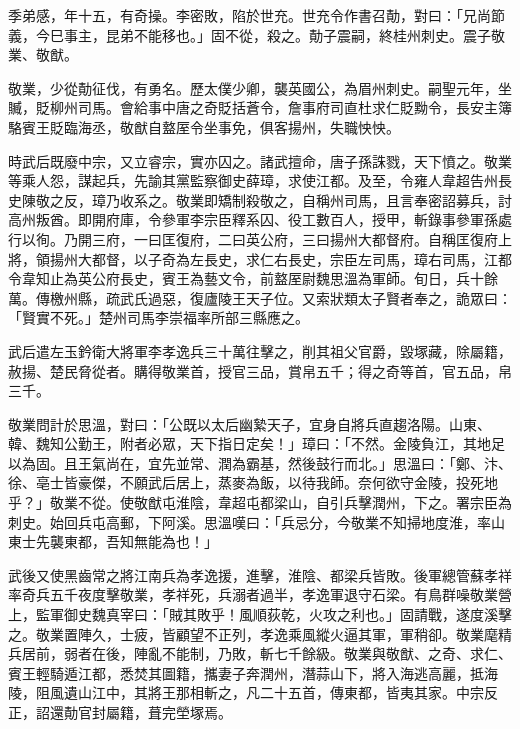 \begin{pinyinscope}
 季弟感，年十五，有奇操。李密敗，陷於世充。世充令作書召勣，對曰：「兄尚節義，今巳事主，昆弟不能移也。」固不從，殺之。勣子震嗣，終桂州刺史。震子敬業、敬猷。



 敬業，少從勣征伐，有勇名。歷太僕少卿，襲英國公，為眉州刺史。嗣聖元年，坐贓，貶柳州司馬。會給事中唐之奇貶括蒼令，詹事府司直杜求仁貶黝令，長安主簿駱賓王貶臨海丞，敬猷自盩厔令坐事免，俱客揚州，失職怏怏。



 時武后既廢中宗，又立睿宗，實亦囚之。諸武擅命，唐子孫誅戮，天下憤之。敬業等乘人怨，謀起兵，先諭其黨監察御史薛璋，求使江都。及至，令雍人韋超告州長史陳敬之反，璋乃收系之。敬業即矯制殺敬之，自稱州司馬，且言奉密詔募兵，討高州叛酋。即開府庫，令參軍李宗臣釋系囚、役工數百人，授甲，斬錄事參軍孫處行以徇。乃開三府，一曰匡復府，二曰英公府，三曰揚州大都督府。自稱匡復府上將，領揚州大都督，以子奇為左長史，求仁右長史，宗臣左司馬，璋右司馬，江都令韋知止為英公府長史，賓王為藝文令，前盩厔尉魏思溫為軍師。旬日，兵十餘萬。傳檄州縣，疏武氏過惡，復廬陵王天子位。又索狀類太子賢者奉之，詭眾曰：「賢實不死。」楚州司馬李崇福率所部三縣應之。



 武后遣左玉鈐衛大將軍李孝逸兵三十萬往擊之，削其祖父官爵，毀塚藏，除屬籍，赦揚、楚民脅從者。購得敬業首，授官三品，賞帛五千；得之奇等首，官五品，帛三千。



 敬業問計於思溫，對曰：「公既以太后幽縶天子，宜身自將兵直趨洛陽。山東、韓、魏知公勤王，附者必眾，天下指日定矣！」璋曰：「不然。金陵負江，其地足以為固。且王氣尚在，宜先並常、潤為霸基，然後鼓行而北。」思溫曰：「鄭、汴、徐、亳士皆豪傑，不願武后居上，蒸麥為飯，以待我師。奈何欲守金陵，投死地乎？」敬業不從。使敬猷屯淮陰，韋超屯都梁山，自引兵擊潤州，下之。署宗臣為刺史。始回兵屯高郵，下阿溪。思溫嘆曰：「兵忌分，今敬業不知掃地度淮，率山東士先襲東都，吾知無能為也！」



 武後又使黑齒常之將江南兵為孝逸援，進擊，淮陰、都梁兵皆敗。後軍總管蘇孝祥率奇兵五千夜度擊敬業，孝祥死，兵溺者過半，孝逸軍退守石梁。有鳥群噪敬業營上，監軍御史魏真宰曰：「賊其敗乎！風順荻乾，火攻之利也。」固請戰，遂度溪擊之。敬業置陣久，士疲，皆顧望不正列，孝逸乘風縱火逼其軍，軍稍卻。敬業麾精兵居前，弱者在後，陣亂不能制，乃敗，斬七千餘級。敬業與敬猷、之奇、求仁、賓王輕騎遁江都，悉焚其圖籍，攜妻子奔潤州，潛蒜山下，將入海逃高麗，抵海陵，阻風遺山江中，其將王那相斬之，凡二十五首，傳東都，皆夷其家。中宗反正，詔還勣官封屬籍，葺完塋塚焉。




\end{pinyinscope}

